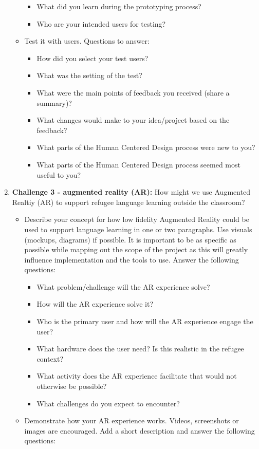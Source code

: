 \documentclass[12pt,twoside]{mitthesis}
\begin{document}
\begin{enumerate}
\begin{itemize}
\begin{itemize}
\item What did you learn during the prototyping process?
\item Who are your intended users for testing?
\end{itemize}
\item Test it with users. Questions to answer:
\begin{itemize}
\item How did you select your test users? 
\item What was the setting of the test? 
\item What were the main points of feedback you received (share a summary)? 
\item What changes would make to your idea/project based on the feedback?
\item What parts of the Human Centered Design process were new to you?
\item What parts of the Human Centered Design process seemed most useful to you?
\end{itemize}
\end{itemize}
\item \textbf{Challenge 3 - augmented reality (AR):} How might we use Augmented Realtiy (AR) to support refugee language learning outside the classroom?
\begin{itemize}
\item Describe your concept for how low fidelity Augmented Reality could be used to support language learning in one or two paragraphs. Use visuals (mockups, diagrams) if possible. It is important to be as specific as possible while mapping out the scope of the project as this will greatly influence implementation and the tools to use. Answer the following questions:
\begin{itemize}
\item What problem/challenge will the AR experience solve? 
\item How will the AR experience solve it? 
\item Who is the primary user and how will the AR experience engage the user?
\item What hardware does the user need? Is this realistic in the refugee context? 
\item What activity does the AR experience facilitate that would not otherwise be possible? 
\item What challenges do you expect to encounter? 
\end{itemize}
\item Demonstrate how your AR experience works. Videos, screenshots or images are encouraged. Add a short description and answer the following questions: 

\end{itemize}
\end{enumerate}
\end{document}
